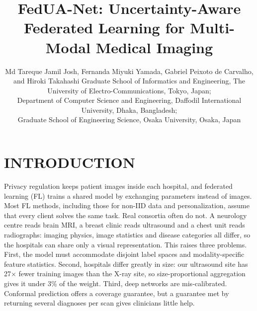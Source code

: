 \documentclass[]{spie}
\title{FedUA-Net: Uncertainty-Aware Federated Learning for Multi-Modal Medical Imaging}
\author{Md Tareque Jamil Josh\supit{a,b}, Fernanda Miyuki Yamada\supit{a}, Gabriel Peixoto de Carvalho\supit{c}, and Hiroki Takahashi\supit{a}
\skiplinehalf
\supit{a}Graduate School of Informatics and Engineering, The University of Electro-Communications, Tokyo, Japan;\\
\supit{b}Department of Computer Science and Engineering, Daffodil International University, Dhaka, Bangladesh;\\
\supit{c}Graduate School of Engineering Science, Osaka University, Osaka, Japan
}
\begin{document}
\maketitle

\begin{abstract}

\end{abstract}


\section{INTRODUCTION}
\label{sec:intro}

Privacy regulation keeps patient images inside each hospital, and federated learning (FL) trains a shared model by exchanging parameters instead of images\cite{mcmahan2017communication,rieke2020future,guan2024federated}. Most FL methods, including those for non-IID data\cite{litian2020fedprox,lixiaoxiao2021fedbn} and personalization\cite{litian2021ditto,oh2022fedbabu}, assume that every client solves the same task. Real consortia often do not. A neurology centre reads brain MRI, a breast clinic reads ultrasound and a chest unit reads radiographs: imaging physics, image statistics and disease categories all differ, so the hospitals can share only a visual representation. This raises three problems. First, the model must accommodate disjoint label spaces and modality-specific feature statistics. Second, hospitals differ greatly in size: our ultrasound site has 27$\times$ fewer training images than the X-ray site, so size-proportional aggregation\cite{mcmahan2017communication} gives it under 3\% of the weight. Third, deep networks are mis-calibrated\cite{guo2017calibration}. Conformal prediction\cite{angelopoulos2023gentle} offers a coverage guarantee, but a guarantee met by returning several diagnoses per scan gives clinicians little help.
\end{document}
